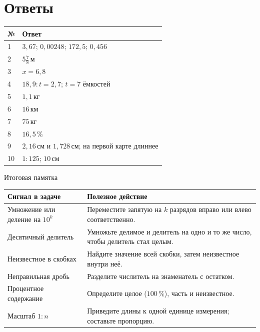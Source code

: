 \documentclass[a4paper,12pt]{article}
\newcommand{\cm}{\,\text{см}}
\newcommand{\km}{\,\text{км}}
\newcommand{\kg}{\,\text{кг}}
\newcommand{\mtr}{\,\text{м}}
\newcommand{\pct}{\,\%}
\begin{document}
\section*{Ответы}
\begin{center}
\renewcommand{\arraystretch}{1.32}
\begin{tabularx}{\linewidth}{lX}
\toprule № & Ответ\\\midrule
1 & $3{,}67$; $0{,}00248$; $172{,}5$; $0{,}456$\\
2 & $5\frac78\mtr$\\
3 & $x=6{,}8$\\
4 & $18{,}9:t=2{,}7$; $t=7$ ёмкостей\\
5 & $1{,}1\kg$\\
6 & $16\km$\\
7 & $75\kg$\\
8 & $16{,}5\pct$\\
9 & $2{,}16\cm$ и $1{,}728\cm$; на первой карте длиннее\\
10 & $1:125$; $10\cm$\\\bottomrule
\end{tabularx}
\end{center}
\vspace{6mm}
\begin{center}{\large\color{darkaccent} Итоговая памятка}\end{center}
\begin{center}
\renewcommand{\arraystretch}{1.35}
\begin{tabularx}{\linewidth}{p{.31\linewidth}X}\toprule
Сигнал в задаче & Полезное действие\\\midrule
Умножение или деление на $10^k$ & Переместите запятую на $k$ разрядов вправо или влево соответственно.\\
Десятичный делитель & Умножьте делимое и делитель на одно и то же число, чтобы делитель стал целым.\\
Неизвестное в скобках & Найдите значение всей скобки, затем неизвестное внутри неё.\\
Неправильная дробь & Разделите числитель на знаменатель с остатком.\\
Процентное содержание & Определите целое ($100\pct$), часть и неизвестное.\\
Масштаб $1:n$ & Приведите длины к одной единице измерения; составьте пропорцию.\\\bottomrule
\end{tabularx}
\end{center}
\end{document}
